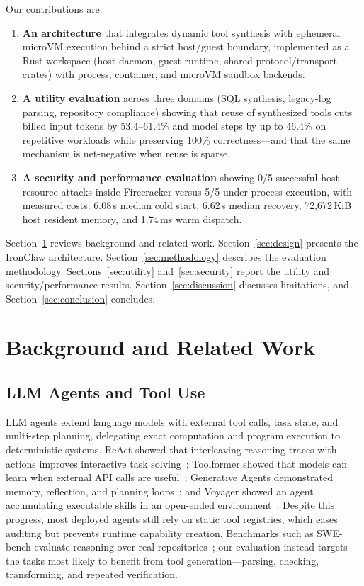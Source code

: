 \documentclass[conference]{IEEEtran}
\newcommand{\toolname}{IronClaw}
\begin{document}
\noindent Our contributions are:
\begin{enumerate}
\item \textbf{An architecture} that integrates dynamic tool synthesis with
ephemeral microVM execution behind a strict host/guest boundary, implemented as
a Rust workspace (host daemon, guest runtime, shared protocol/transport
crates) with process, container, and microVM sandbox backends.
\item \textbf{A utility evaluation} across three domains (SQL synthesis,
legacy-log parsing, repository compliance) showing that reuse of synthesized
tools cuts billed input tokens by 53.4--61.4\% and model steps by up to 46.4\%
on repetitive workloads while preserving 100\% correctness---and that the same
mechanism is net-negative when reuse is sparse.
\item \textbf{A security and performance evaluation} showing 0/5 successful
host-resource attacks inside Firecracker versus 5/5 under process execution,
with measured costs: 6.08\,s median cold start, 6.62\,s median recovery,
72{,}672\,KiB host resident memory, and 1.74\,ms warm dispatch.
\end{enumerate}

Section~\ref{sec:background} reviews background and related work.
Section~\ref{sec:design} presents the \toolname{} architecture.
Section~\ref{sec:methodology} describes the evaluation methodology.
Sections~\ref{sec:utility} and~\ref{sec:security} report the utility and
security/performance results. Section~\ref{sec:discussion} discusses
limitations, and Section~\ref{sec:conclusion} concludes.

\section{Background and Related Work}
\label{sec:background}

\subsection{LLM Agents and Tool Use}
LLM agents extend language models with external tool calls, task state, and
multi-step planning, delegating exact computation and program execution to
deterministic systems. ReAct showed that interleaving reasoning traces with
actions improves interactive task solving~\cite{yao2023react}; Toolformer
showed that models can learn when external API calls are
useful~\cite{schick2023toolformer}; Generative Agents demonstrated memory,
reflection, and planning loops~\cite{park2023generative}; and Voyager showed an
agent accumulating executable skills in an open-ended
environment~\cite{wang2023voyager}. Despite this progress, most deployed
agents still rely on static tool registries, which eases auditing but prevents
runtime capability creation. Benchmarks such as SWE-bench evaluate reasoning
over real repositories~\cite{swebench}; our evaluation instead targets the
tasks most likely to benefit from tool generation---parsing, checking,
transforming, and repeated verification.
\end{document}
